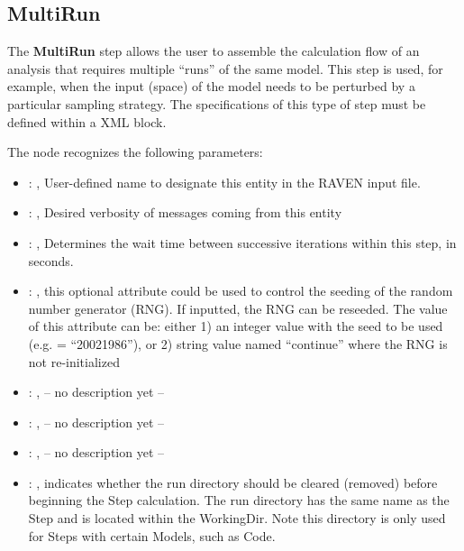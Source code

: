 

\subsection{MultiRun}
   The \textbf{MultiRun} step allows the user to assemble the calculation flow of an analysis that
  requires multiple ``runs'' of the same model. This step is used, for example, when the input
  (space) of the model needs to be perturbed by a particular sampling strategy. The specifications
  of this type of step must be defined within a  XML block.

  The  node recognizes the following parameters:
    \begin{itemize}
      \item {}: , 
        User-defined name to designate this entity in the RAVEN input file.
      \item {}: , 
        Desired verbosity of messages coming from this entity
      \item {}: , 
        Determines the wait time between successive iterations within this step, in seconds.
      \item {}: , 
         this optional attribute could be used to control the seeding of the random number generator
        (RNG). If inputted, the RNG can be reseeded. The value of this attribute can be: either 1)
        an integer value with the seed to be used (e.g.  = ``20021986''), or 2)
        string value named ``continue'' where the RNG is not re-initialized
      \item {}: , 
        -- no description yet --
      \item {}: , 
        -- no description yet --
      \item {}: , 
        -- no description yet --
      \item {}: , 
        indicates whether the run directory should be cleared (removed) before beginning
        the Step calculation. The run directory has the same name as the Step and is located
        within the WorkingDir. Note this directory is only used for Steps with certain Models,
        such as Code.               
  \end{itemize}

